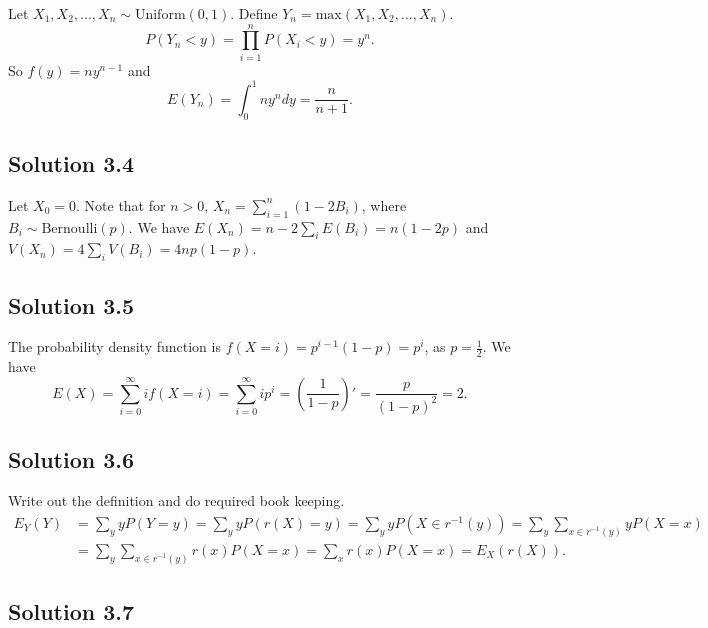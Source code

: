 Let $X_1, X_2, ..., X_n \sim \mathrm{Uniform}(0, 1)$.
Define $Y_n = \mathrm{max}(X_1, X_2, ..., X_n)$.
\begin{equation*}
    P(Y_n < y) = \prod_{i=1}^n P(X_i < y)
        = y^n.
\end{equation*}
So $f(y) = ny^{n-1}$ and
\begin{equation*}
    E(Y_n) = \int_0^1 ny^{n} dy
        = \frac{n}{n + 1}.
\end{equation*}


\subsection*{Solution 3.4}

Let $X_0 = 0$.
Note that for $n > 0$, $X_n = \sum_{i = 1}^n (1 - 2B_i)$, where $B_i \sim \mathrm{Bernoulli}(p)$.
We have $E(X_n) = n - 2\sum_i E(B_i) = n(1 - 2p)$ and $V(X_n) = 4\sum_i V(B_i) = 4np(1-p)$.


\subsection*{Solution 3.5}

The probability density function is $f(X = i) = p^{i - 1} (1 - p) = p^i$, as $p = \frac{1}{2}$.
We have
\begin{equation*}
    E(X) = \sum_{i = 0}^{\infty} if(X = i)
        = \sum_{i = 0}^{\infty} i p^i
        = \left( \frac{1}{1 - p} \right)'
        = \frac{p}{(1 - p)^2}
        = 2.
\end{equation*}


\subsection*{Solution 3.6}

Write out the definition and do required book keeping.
\begin{equation*}
    \begin{split}
        E_Y(Y) &= \sum_y y P(Y = y)
            = \sum_y y P(r(X) = y)
            = \sum_y y P(X \in r^{-1}(y))
            = \sum_y \sum_{x \in r^{-1}(y)} y P(X = x) \\
            &= \sum_y \sum_{x \in r^{-1}(y)} r(x) P(X = x)
            = \sum_x r(x) P(X = x)
            = E_X(r(X)).
    \end{split}
\end{equation*}


\subsection*{Solution 3.7}

